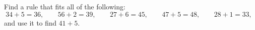 Find a rule that fits all of the following:
\[34+5=36,\qquad 56+2=39,\qquad 27+6=45,\qquad 47+5=48,\qquad 28+1=33,\]
and use it to find $41+5$.
